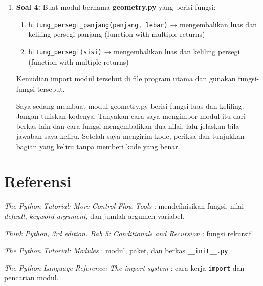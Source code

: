 \begin{enumerate}
      \begin{promptterarah}
      Saya sedang membuat fungsi rekursif untuk deret Fibonacci. Jangan tuliskan kodenya. Tanyakan kasus dasar dan langkah rekursif yang saya rencanakan, lalu beri petunjuk bila salah satunya keliru. Setelah saya mengirim kode, minta saya menelusuri pemanggilan untuk n = 4 dan periksa penelusuran saya.
      \end{promptterarah}
    \item \textbf{Soal 4:} Buat modul bernama \textbf{geometry.py} yang berisi fungsi:
    \begin{enumerate}
        \item \texttt{hitung_persegi_panjang(panjang, lebar)} → mengembalikan luas dan keliling persegi panjang (function with multiple returns)
        \item \texttt{hitung_persegi(sisi)} → mengembalikan luas dan keliling persegi (function with multiple returns)
    \end{enumerate}
    Kemudian import modul tersebut di file program utama dan gunakan fungsi-fungsi tersebut.

  \begin{promptterarah}
  Saya sedang membuat modul geometry.py berisi fungsi luas dan keliling. Jangan tuliskan kodenya. Tanyakan cara saya mengimpor modul itu dari berkas lain dan cara fungsi mengembalikan dua nilai, lalu jelaskan bila jawaban saya keliru. Setelah saya mengirim kode, periksa dan tunjukkan bagian yang keliru tanpa memberi kode yang benar.
  \end{promptterarah}
\end{enumerate}

\section*{Referensi}
\begin{daftarrapat}
  \item \textit{The Python Tutorial: More Control Flow Tools} \cite{py-tut-controlflow}: mendefinisikan fungsi, nilai \textit{default}, \textit{keyword argument}, dan jumlah argumen variabel.
  \item \textit{Think Python, 3rd edition. Bab 5: Conditionals and Recursion} \cite{thinkpython-ch5}: fungsi rekursif.
  \item \textit{The Python Tutorial: Modules} \cite{py-tut-modules}: modul, paket, dan berkas \texttt{__init__.py}.
  \item \textit{The Python Language Reference: The import system} \cite{py-ref-import}: cara kerja \texttt{import} dan pencarian modul.
\end{daftarrapat}
